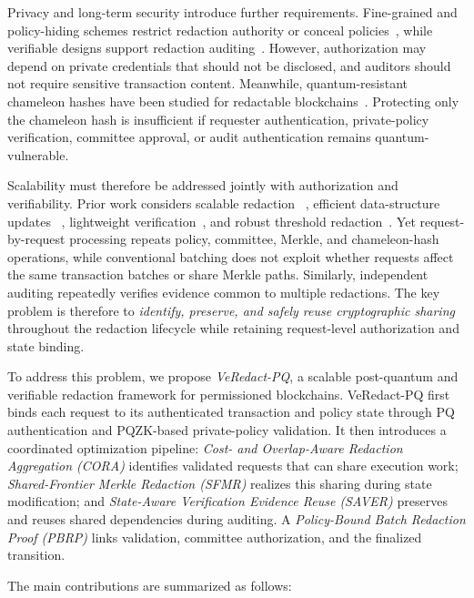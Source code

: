 \documentclass[lettersize,journal]{IEEEtran}
\begin{document}
Privacy and long-term security introduce further requirements.
Fine-grained and policy-hiding schemes restrict redaction authority or
conceal policies~\cite{ref4,ref18,ref31,ref34}, while verifiable designs
support redaction auditing~\cite{ref13,ref20,ref33}. However,
authorization may depend on private credentials that should not be
disclosed, and auditors should not require sensitive transaction
content. Meanwhile, quantum-resistant chameleon hashes have been
studied for redactable blockchains~\cite{ref10,ref11,ref17,ref37}.
Protecting only the chameleon hash is insufficient if requester
authentication, private-policy verification, committee approval, or
audit authentication remains quantum-vulnerable.

Scalability must therefore be addressed jointly with authorization and
verifiability. Prior work considers scalable redaction
~\cite{ref14,ref21,ref26}, efficient data-structure updates
~\cite{ref23}, lightweight verification~\cite{ref20}, and robust
threshold redaction~\cite{ref27}. Yet request-by-request processing
repeats policy, committee, Merkle, and chameleon-hash operations, while
conventional batching does not exploit whether requests affect the same
transaction batches or share Merkle paths. Similarly, independent
auditing repeatedly verifies evidence common to multiple redactions.
The key problem is therefore to \emph{identify, preserve, and safely
reuse cryptographic sharing} throughout the redaction lifecycle while
retaining request-level authorization and state binding.

To address this problem, we propose \emph{VeRedact-PQ}, a scalable
post-quantum and verifiable redaction framework for permissioned
blockchains. VeRedact-PQ first binds each request to its authenticated
transaction and policy state through PQ authentication and PQZK-based
private-policy validation. It then introduces a coordinated optimization
pipeline: \emph{Cost- and Overlap-Aware Redaction Aggregation (CORA)}
identifies validated requests that can share execution work;
\emph{Shared-Frontier Merkle Redaction (SFMR)} realizes this sharing
during state modification; and \emph{State-Aware Verification Evidence
Reuse (SAVER)} preserves and reuses shared dependencies during auditing.
A \emph{Policy-Bound Batch Redaction Proof (PBRP)} links validation,
committee authorization, and the finalized transition.

The main contributions are summarized as follows:
\end{document}
